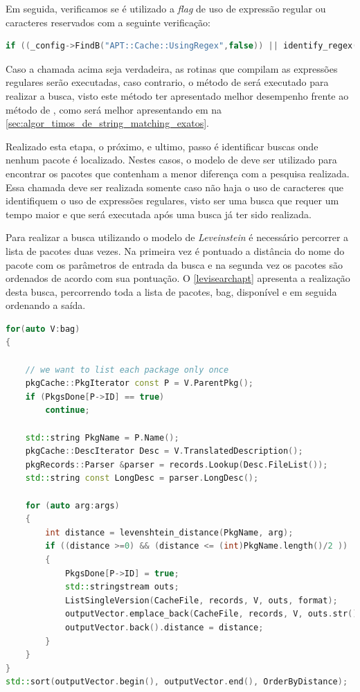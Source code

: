 Em seguida, verificamos se é utilizado a \textit{flag} de uso de expressão regular ou caracteres reservados com a seguinte verificação:

\begin{lstlisting}[language=C++,basicstyle=\footnotesize\ttfamily,numbers=none]
if ((_config->FindB("APT::Cache::UsingRegex",false)) || identify_regex(args))
\end{lstlisting}

Caso a chamada acima seja verdadeira, as rotinas que compilam as expressões regulares serão executadas, caso contrario, o método de  será executado para realizar a busca, visto este método ter apresentado melhor desempenho frente ao método de , como será melhor apresentando em  na \autoref{sec:algor_timos_de_string_matching_exatos}.


Realizado esta etapa, o próximo, e ultimo, passo é identificar buscas onde nenhum pacote é localizado. Nestes casos, o modelo de \textit{} deve ser utilizado para encontrar os pacotes que contenham a menor diferença com a pesquisa realizada. Essa chamada deve ser realizada somente caso não haja o uso de caracteres que identifiquem o uso de expressões regulares, visto ser uma busca que requer um tempo maior e que será executada após uma busca já ter sido realizada.

Para realizar a busca utilizando o modelo de \textit{Leveinstein} é necessário percorrer a lista de pacotes duas vezes. Na primeira vez é pontuado a distância do nome do pacote com os parâmetros de entrada da busca e na segunda vez os pacotes são ordenados de acordo com sua pontuação. O \autoref{levisearchapt} apresenta a realização desta busca, percorrendo toda a lista de pacotes, {\code bag}, disponível e em seguida ordenando a saída.

\begin{lstlisting}[language=C++,label=levisearchapt,caption={Busca ordenada por distância de \textit{Levenshtein}}]
for(auto V:bag)
{

	// we want to list each package only once
	pkgCache::PkgIterator const P = V.ParentPkg();
	if (PkgsDone[P->ID] == true)
		continue;

	std::string PkgName = P.Name();
	pkgCache::DescIterator Desc = V.TranslatedDescription();
	pkgRecords::Parser &parser = records.Lookup(Desc.FileList());
	std::string const LongDesc = parser.LongDesc();

	for (auto arg:args)
	{
		int distance = levenshtein_distance(PkgName, arg);
		if ((distance >=0) && (distance <= (int)PkgName.length()/2 ))
		{
			PkgsDone[P->ID] = true;
			std::stringstream outs;
			ListSingleVersion(CacheFile, records, V, outs, format);
			outputVector.emplace_back(CacheFile, records, V, outs.str());
			outputVector.back().distance = distance;
		}
	}
}
std::sort(outputVector.begin(), outputVector.end(), OrderByDistance);
\end{lstlisting}

